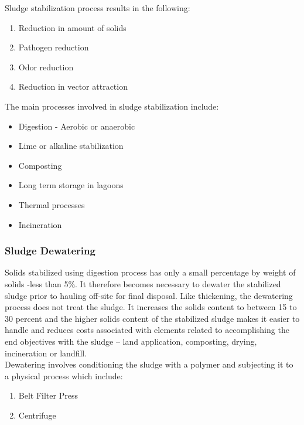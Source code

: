 Sludge stabilization process results in the following:
\begin{enumerate}
\item Reduction in amount of solids
\item Pathogen reduction
\item Odor reduction
\item Reduction in vector attraction
\end{enumerate}
The main processes involved in sludge stabilization include:
\begin{itemize}
\item Digestion - Aerobic or anaerobic
\item Lime or alkaline stabilization
\item Composting
\item Long term storage in lagoons
\item Thermal processes
\item Incineration
\end{itemize}
\subsubsection{Sludge Dewatering}
Solids stabilized using digestion process has only a small percentage by weight of solids -less than 5\%.  It therefore becomes necessary to dewater the stabilized sludge prior to hauling off-site for final disposal.  Like thickening, the dewatering process does not treat the sludge.  It increases the solids content to between 15 to 30 percent and the higher solids content of the stabilized sludge makes it easier to handle and reduces costs associated with elements related to accomplishing the end objectives with the sludge – land application, composting, drying, incineration or landfill.\\
Dewatering involves conditioning the sludge with a polymer and subjecting it to a physical process which include:
\begin{enumerate}
\item Belt Filter Press 
\item Centrifuge
\end{enumerate}







